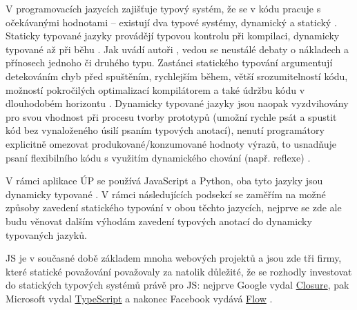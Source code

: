V programovacích jazycích zajišťuje typový systém, že se v kódu pracuje s očekávanými hodnotami -- existují dva typové systémy, dynamický a statický \cite{types-study}. Staticky typované jazyky provádějí typovou kontrolu při kompilaci, dynamicky typované až při běhu \cite{types-study}. Jak uvádí autoři \cite{types-study}, vedou se neustálé debaty o nákladech a přínosech jednoho či druhého typu. Zastánci statického typování argumentují detekováním chyb před spuštěním, rychlejším během, větší srozumitelností kódu, možností pokročilých optimalizací kompilátorem \cite{types-study} a také údržbu kódu v dlouhodobém horizontu \cite{types-developerhowto}. Dynamicky typované jazyky jsou naopak vyzdvihovány pro svou vhodnost při procesu tvorby prototypů (umožní rychle psát a spustit kód bez vynaloženého úsilí psaním typových anotací), nenutí programátory explicitně omezovat produkované/konzumované hodnoty výrazů, to usnadňuje psaní flexibilního kódu s využitím dynamického chování (např. reflexe) \cite{types-study}.

V rámci aplikace ÚP se používá JavaScript a Python, oba tyto jazyky jsou dynamicky typované \cite{bp}. V rámci následujících podsekcí se zaměřím na možné způsoby zavedení statického typování v obou těchto jazycích, nejprve se zde ale budu věnovat dalším výhodám zavedení typových anotací do dynamicky typovaných jazyků.

JS je v současné době základem mnoha webových projektů a jsou zde tři firmy, které statické považování považovaly za natolik důležité, že se rozhodly investovat do statických typových systémů právě pro JS: nejprve Google vydal \href{https://developers.google.com/closure/compiler/}{Closure}, pak Microsoft vydal \href{https://www.typescriptlang.org/}{TypeScript} a nakonec Facebook vydává \href{https://flow.org/}{Flow} \cite{types-study}.

